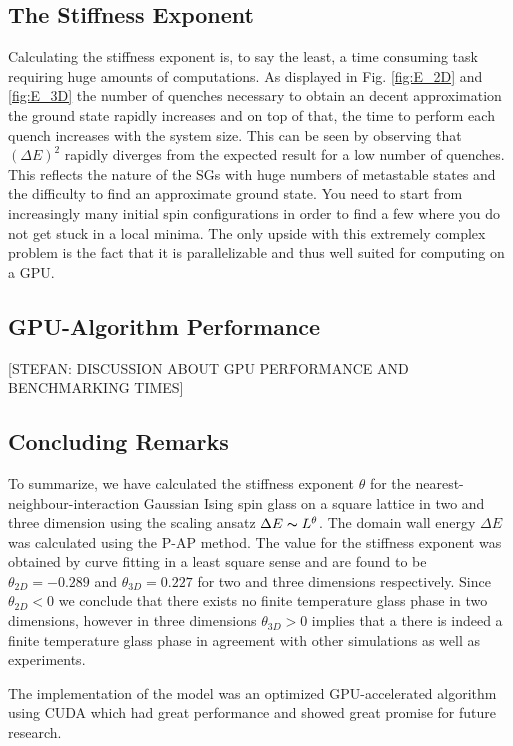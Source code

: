 \documentclass[paper=a4, fontsize=11pt]{scrartcl} %
\numberwithin{equation}{section} %
\numberwithin{figure}{section} %
\numberwithin{table}{section} %
\begin{document}
\subsection{The Stiffness Exponent}
Calculating the stiffness exponent is, to say the least, a time consuming task requiring huge amounts of computations. As displayed in Fig. \ref{fig:E_2D} and \ref{fig:E_3D} the number of quenches necessary to obtain an decent approximation the ground state rapidly increases and on top of that, the time to perform each quench increases with the system size. This can be seen by observing that $(\Delta E)^2$ rapidly diverges from the expected result for a low number of quenches. This reflects the nature of the SGs with huge numbers of metastable states and the difficulty to find an approximate ground state. You need to start from increasingly many initial spin configurations in order to find a few where you do not get stuck in a local minima. The only upside with this extremely complex problem is the fact that it is parallelizable and thus well suited for computing on a GPU.

\subsection{GPU-Algorithm Performance}
[STEFAN: DISCUSSION ABOUT GPU PERFORMANCE AND BENCHMARKING TIMES]

\subsection{Concluding Remarks}
To summarize, we have calculated the stiffness exponent $\theta$ for the nearest-neighbour-interaction Gaussian Ising spin glass on a square lattice in two and three dimension using the scaling ansatz $\Delta E \thicksim L^\theta$. The domain wall energy $\Delta E$ was calculated using the P-AP method. The value for the stiffness exponent was obtained by curve fitting in a least square sense and are found to be $\theta_{2D}=-0.289$ and $\theta_{3D}=0.227$ for two and three dimensions respectively. Since $\theta_{2D}<0$ we conclude that there exists no finite temperature glass phase in two dimensions, however in three dimensions $\theta_{3D}>0$ implies that a there is indeed a finite temperature glass phase in agreement with other simulations as well as experiments\cite{hartmann}\cite{fisher}\cite{carter}. 

The implementation of the model was an optimized GPU-accelerated algorithm using CUDA which had great performance and showed great promise for future research.
\end{document}
